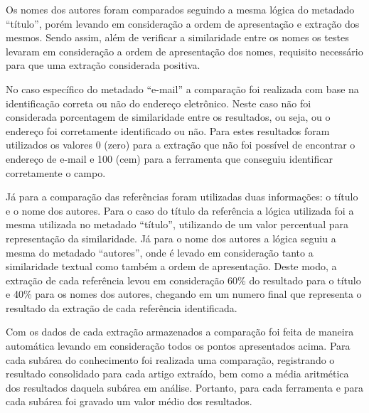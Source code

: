 Os nomes dos autores foram comparados seguindo a mesma lógica do metadado ``título'', porém levando em consideração a ordem de apresentação e extração dos mesmos. Sendo assim, além de verificar a similaridade entre os nomes os testes levaram em consideração a ordem de apresentação dos nomes, requisito necessário para que uma extração considerada positiva.


No caso específico do metadado ``e-mail'' a comparação foi realizada com base na identificação correta ou não do endereço eletrônico. Neste caso não foi considerada porcentagem de similaridade entre os resultados, ou seja, ou o endereço foi corretamente identificado ou não. Para estes resultados foram utilizados os valores 0 (zero) para a extração que não foi possível de encontrar o endereço de e-mail e 100 (cem) para a ferramenta que conseguiu identificar corretamente o campo.


Já para a comparação das referências foram utilizadas duas informações: o título e o nome dos autores. Para o caso do título da referência a lógica utilizada foi a mesma utilizada no metadado ``título'', utilizando de um valor percentual para representação da similaridade. Já para o nome dos autores a lógica seguiu a mesma do metadado ``autores'', onde é levado em consideração tanto a similaridade textual como também a ordem de apresentação. Deste modo, a extração de cada referência levou em consideração 60\% do resultado para o título e 40\% para os nomes dos autores, chegando em um numero final que representa o resultado da extração de cada referência identificada.


Com os dados de cada extração armazenados a comparação foi feita de maneira automática levando em consideração todos os pontos apresentados acima. Para cada subárea do conhecimento foi realizada uma comparação, registrando o resultado consolidado para cada artigo extraído, bem como a média aritmética dos resultados daquela subárea em análise. Portanto, para cada ferramenta e para cada subárea foi gravado um valor médio dos resultados.

